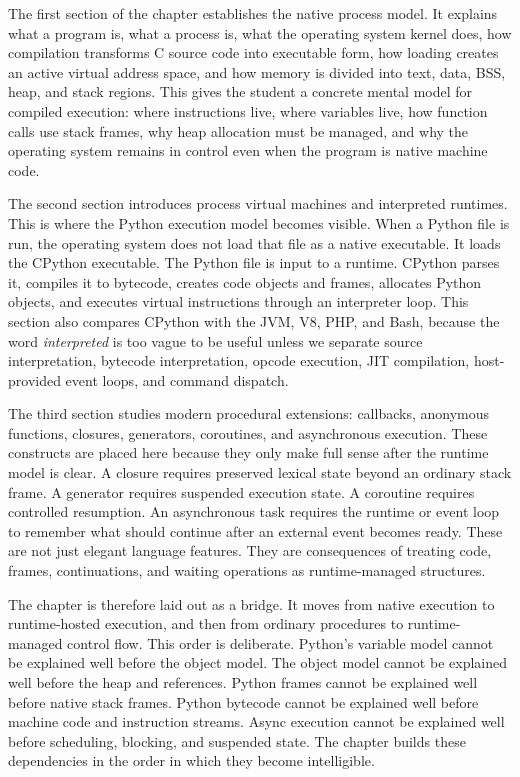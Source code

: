 \documentclass[a4paper,twoside]{report}
\begin{document}
The first section of the chapter establishes the native process model. It explains what a program is, what a process is, what the operating system kernel does, how compilation transforms C source code into executable form, how loading creates an active virtual address space, and how memory is divided into text, data, BSS, heap, and stack regions. This gives the student a concrete mental model for compiled execution: where instructions live, where variables live, how function calls use stack frames, why heap allocation must be managed, and why the operating system remains in control even when the program is native machine code.

The second section introduces process virtual machines and interpreted runtimes. This is where the Python execution model becomes visible. When a Python file is run, the operating system does not load that file as a native executable. It loads the CPython executable. The Python file is input to a runtime. CPython parses it, compiles it to bytecode, creates code objects and frames, allocates Python objects, and executes virtual instructions through an interpreter loop. This section also compares CPython with the JVM, V8, PHP, and Bash, because the word \emph{interpreted} is too vague to be useful unless we separate source interpretation, bytecode interpretation, opcode execution, JIT compilation, host-provided event loops, and command dispatch.

The third section studies modern procedural extensions: callbacks, anonymous functions, closures, generators, coroutines, and asynchronous execution. These constructs are placed here because they only make full sense after the runtime model is clear. A closure requires preserved lexical state beyond an ordinary stack frame. A generator requires suspended execution state. A coroutine requires controlled resumption. An asynchronous task requires the runtime or event loop to remember what should continue after an external event becomes ready. These are not just elegant language features. They are consequences of treating code, frames, continuations, and waiting operations as runtime-managed structures.

The chapter is therefore laid out as a bridge. It moves from native execution to runtime-hosted execution, and then from ordinary procedures to runtime-managed control flow. This order is deliberate. Python's variable model cannot be explained well before the object model. The object model cannot be explained well before the heap and references. Python frames cannot be explained well before native stack frames. Python bytecode cannot be explained well before machine code and instruction streams. Async execution cannot be explained well before scheduling, blocking, and suspended state. The chapter builds these dependencies in the order in which they become intelligible.
\end{document}
